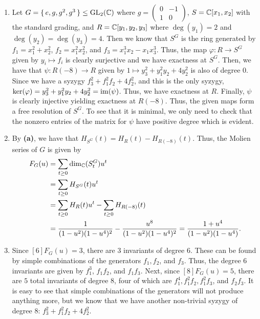 \documentclass[letterpaper, 11pt, oneside]{book}
\begin{document}
\begin{sol}\label{ex:UAG_6.4.12}
  \begin{enumerate}
    \item Let $G = \set{e, g, g^{2}, g^{3}} \leq \operatorname{GL}_{2}(\mathbb{C})$ where $g = \begin{pmatrix} 0 & -1 \\ 1 & 0 \end{pmatrix}$, $S = \mathbb{C}[x_{1}, x_{2}]$ with the standard grading, and $R = \mathbb{C}[y_{1}, y_{2}, y_{3}]$ where $\deg(y_{1}) = 2$ and $\deg(y_{2}) = \deg(y_{3}) = 4$.
          Then we know that $S^{G}$ is the ring generated by $f_{1} = x_{1}^{2} + x_{2}^{2}$, $f_{2} = x_{1}^{2}x_{2}^{2}$, and $f_{3} = x_{1}^{3}x_{2} - x_{1}x_{3}^{3}$.
          Thus, the map $\varphi\colon R \to S^{G}$ given by $y_{i} \mapsto f_{i}$ is clearly surjective and we have exactness at $S^{G}$.
          Then, we have that $\psi\colon R(-8) \to R$ given by $1 \mapsto y_{3}^{2} + y_{1}^{2}y_{2} + 4y_{2}^{2}$ is also of degree $0$.
          Since we have a syzygy $f_{3}^{2} + f_{1}^{2}f_{2} + 4 f_{2}^{2}$, and this is the only syzygy, $\ker(\varphi) = \ideal{y_{3}^{2} + y_{1}^{2}y_{2} + 4y_{2}^{2}} = \im(\psi)$.
          Thus, we have exactness at $R$.
          Finally, $\psi$ is clearly injective yielding exactness at $R(-8)$.
          Thus, the given maps form a free resolution of $S^{G}$.
          To see that it is minimal, we only need to check that the nonzero entries of the matrix for $\psi$ have positive degree which is evident.
    \item By \textbf{(a)}, we have that $H_{S^{G}}(t) = H_{R}(t) - H_{R(-8)}(t)$.
          Thus, the Molien series of $G$ is given by
          \begin{align*}
            F_{G}(u) &= \sum_{t \geq 0} \dim_{\mathbb{C}}(S^{G}_{t})u^{t} \\
                     &= \sum_{t \geq 0} H_{S^{G}}(t) u^{t} \\
                     &= \sum_{t \geq 0} H_{R}(t) u^{t} - \sum_{t \geq 0} H_{R(-8)}(t) \\
                     &= \frac{1}{(1 - u^{2})(1 - u^{4})^{2}} - \frac{u^{8}}{(1 - u^{2})(1 - u^{4})^{2}} = \frac{1 + u^{4}}{(1 - u^{2})(1 - u^{4})}.
          \end{align*}
    \item Since $[6]F_{G}(u) = 3$, there are 3 invariants of degree $6$.
          These can be found by simple combinations of the generators $f_{1}, f_{2}$, and $f_{3}$.
          Thus, the degree $6$ invariants are given by $f_{1}^{3}$, $f_{1}f_{2}$, and $f_{1}f_{3}$.
          Next, since $[8]F_{G}(u) = 5$, there are $5$ total invariants of degree $8$, four of which are $f_{1}^{4}, f_{1}^{2}f_{2}, f_{1}^{2}f_{3}$, and $f_{2}f_{3}$.
          It is easy to see that simple combinations of the generators will not produce anything more, but we know that we have another non-trivial syzygy of degree $8$: $f_{3}^{2} + f_{1}^{2}f_{2} + 4 f_{2}^{2}$.
  \end{enumerate}
\end{sol}
\end{document}
